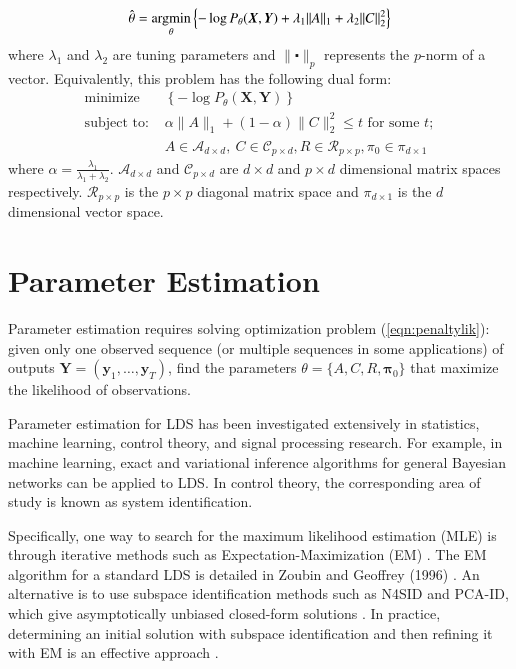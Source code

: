 \documentclass[times,twocolumn,final,authoryear]{elsarticle}
\providecommand{\mb}[1]{\boldsymbol{#1}}
\newcommand{\by}{\mb{y}}
\newcommand{\bX}{\mb{X}}
\newcommand{\bY}{\mb{Y}}
\newcommand{\argmin}{\operatornamewithlimits{argmin}}
\let\oldref\ref
\renewcommand{\ref}[1]{(\oldref{#1})}
\begin{document}
\begin{equation}\label{eqn:penaltylik}
\hat{\theta}=\argmin_{\substack{\theta}}\left\{-\log P_\theta(\bX,\bY)+\lambda_1\|A\|_1+\lambda_2\|C\|_2^2\right\}
\end{equation}
where $\lambda_1$ and $\lambda_2$ are tuning parameters and $\|\centerdot\|_p$ represents the $p$-norm of a vector. Equivalently, this problem has the following dual form:
\begin{equation*}\label{eqn:penaltylikdual}
\begin{aligned}
&\text{minimize}&\left\{-\log P_\theta(\bX,\bY)\right\}&\\
&\text{subject to: }
& \alpha\|A\|_1+ (1-\alpha)\|C\|_2^2 \leq t \text{ for some }t; &\\
&& A\in \mathcal{A}_{d\times d},\ C \in \mathcal{C}_{p \times d}, R \in \mathcal{R}_{p\times p}, \pi_0 \in \mathcal{\pi}_{d\times 1}&
\end{aligned}
\end{equation*}
where $\alpha = \frac{\lambda_1}{\lambda_1 + \lambda_2}$. $\mathcal{A}_{d\times d}$ and $\mathcal{C}_{p \times d}$ are $d\times d$ and $p \times d$ dimensional matrix spaces respectively. $\mathcal{R}_{p \times p}$ is the $p \times p$ diagonal matrix space and $\mathcal{\pi}_{d\times 1}$ is the $d$ dimensional vector space.
\section{Parameter Estimation}
Parameter estimation requires solving optimization problem \ref{eqn:penaltylik}: given only one observed sequence (or multiple sequences in some applications) of outputs $\bY=(\by_1,\ldots,\by_T)$, find the parameters $\theta=\{A,C,R,\mathbf{\pi}_0\}$ that maximize the likelihood of observations.

Parameter estimation for LDS has been investigated extensively in statistics, machine learning, control theory, and signal processing research. For example, in machine learning, exact and variational inference algorithms for general Bayesian networks can be applied to LDS. In control theory, the corresponding area of study is known as system identification.

Specifically, one way to search for the maximum likelihood estimation (MLE) is through iterative methods such as Expectation-Maximization (EM) \citep{shumway1982approach}. The EM algorithm for a standard LDS is detailed in Zoubin and Geoffrey (1996) \citep{ghahramani1996parameter}. An alternative is to use subspace identification methods such as N4SID and PCA-ID, which give asymptotically unbiased closed-form solutions \citep{van1994n4sid,doretto2003dynamic}. In practice, determining an initial solution with subspace identification and then refining it with EM is an effective approach \citep{bootslearning}.
\end{document}
